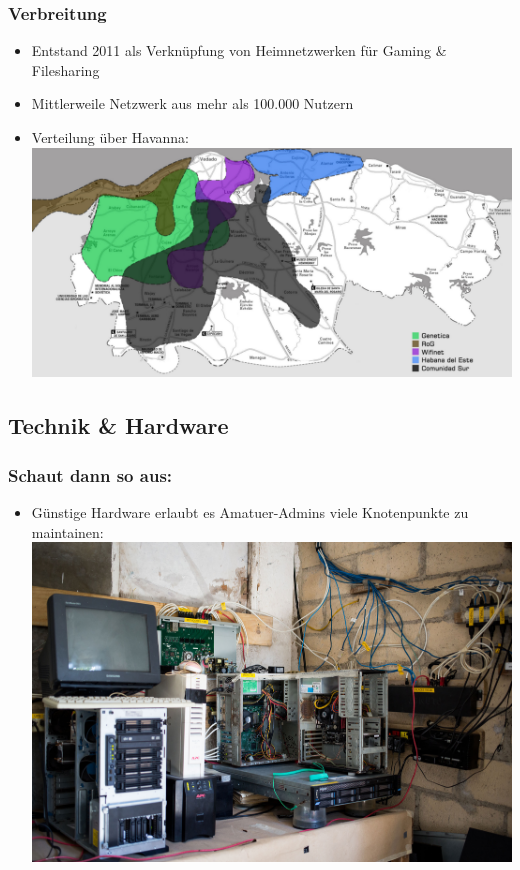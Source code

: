 \begin{frame}
\frametitle{Verbreitung}
	\begin{itemize}
		\item Entstand 2011 als Verknüpfung von Heimnetzwerken für Gaming & Filesharing
		\item Mittlerweile Netzwerk aus mehr als 100.000 Nutzern
		\item Verteilung über Havanna:
			\includegraphics[width=\textwidth]{images/havanna_net.jpg}
	\end{itemize}
	
\end{frame}

\subsection{Technik & Hardware}

\begin{frame}
\frametitle{Schaut dann so aus:}
	\begin{itemize}
		\item Günstige Hardware erlaubt es Amatuer-Admins viele Knotenpunkte zu maintainen:
			\includegraphics[width=\textwidth]{images/snet_pillar.jpg}
	\end{itemize}
\end{frame}